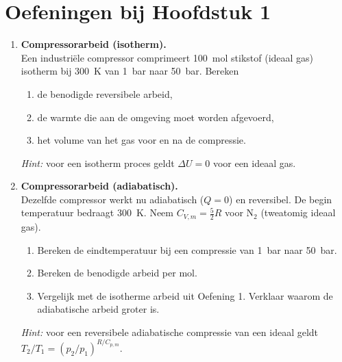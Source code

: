 
\section*{Oefeningen bij Hoofdstuk 1}


\begin{enumerate}

\item \textbf{Compressorarbeid (isotherm).} \\
Een industri\"ele compressor comprimeert \SI{100}{\mole} stikstof (ideaal gas) isotherm bij \SI{300}{\kelvin} van \SI{1}{\bar} naar \SI{50}{\bar}. Bereken
\begin{enumerate}
\item[(a)] de benodigde reversibele arbeid,
\item[(b)] de warmte die aan de omgeving moet worden afgevoerd,
\item[(c)] het volume van het gas voor en na de compressie.
\end{enumerate}
\emph{Hint:} voor een isotherm proces geldt $\Delta U = 0$ voor een ideaal gas.

\item \textbf{Compressorarbeid (adiabatisch).} \\
Dezelfde compressor werkt nu adiabatisch ($Q = 0$) en reversibel. De begin temperatuur bedraagt \SI{300}{\kelvin}. Neem $C_{V,m} = \frac{5}{2}R$ voor $\mathrm{N_2}$ (tweatomig ideaal gas).
\begin{enumerate}
\item[(a)] Bereken de eindtemperatuur bij een compressie van \SI{1}{\bar} naar \SI{50}{\bar}.
\item[(b)] Bereken de benodigde arbeid per mol.
\item[(c)] Vergelijk met de isotherme arbeid uit Oefening 1. Verklaar waarom de adiabatische arbeid groter is.
\end{enumerate}
\emph{Hint:} voor een reversibele adiabatische compressie van een ideaal geldt $T_2/T_1 = (p_2/p_1)^{R/C_{p,m}}$.


\end{enumerate}
